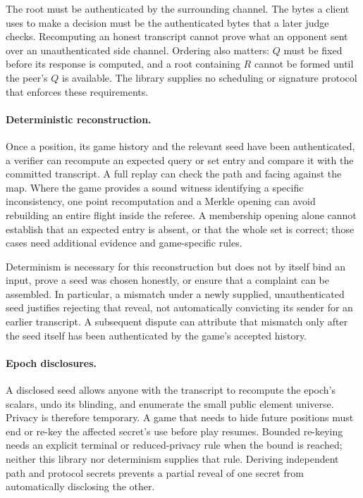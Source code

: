 \documentclass[11pt]{article}
\begin{document}
The root must be authenticated by the surrounding channel. The bytes a client
uses to make a decision must be the authenticated bytes that a later judge
checks. Recomputing an honest transcript cannot prove what an opponent sent
over an unauthenticated side channel. Ordering also matters: $Q$ must be fixed
before its response is computed, and a root containing $R$ cannot be formed
until the peer's $Q$ is available. The library supplies no scheduling or
signature protocol that enforces these requirements.

\paragraph{Deterministic reconstruction.}
Once a position, its game history and the relevant seed have been
authenticated, a verifier can recompute an expected query or set entry and
compare it with the committed transcript. A full replay can check the path and
facing against the map. Where the game provides a sound witness identifying a
specific inconsistency, one point recomputation and a Merkle opening can avoid
rebuilding an entire flight inside the referee. A membership opening alone
cannot establish that an expected entry is absent, or that the whole set is
correct; those cases need additional evidence and game-specific rules.

Determinism is necessary for this reconstruction but does not by itself bind
an input, prove a seed was chosen honestly, or ensure that a complaint can be
assembled. In particular, a mismatch under a newly supplied, unauthenticated
seed justifies rejecting that reveal, not automatically convicting its sender
for an earlier transcript. A subsequent dispute can attribute that mismatch
only after the seed itself has been authenticated by the game's accepted
history.

\paragraph{Epoch disclosures.}
A disclosed seed allows anyone with the transcript to recompute the epoch's
scalars, undo its blinding, and enumerate the small public element universe.
Privacy is therefore temporary. A game that needs to hide future positions
must end or re-key the affected secret's use before play resumes. Bounded
re-keying needs an explicit terminal or reduced-privacy rule when the bound is
reached; neither this library nor determinism supplies that rule. Deriving
independent path and protocol secrets prevents a partial reveal of one secret
from automatically disclosing the other.
\end{document}
